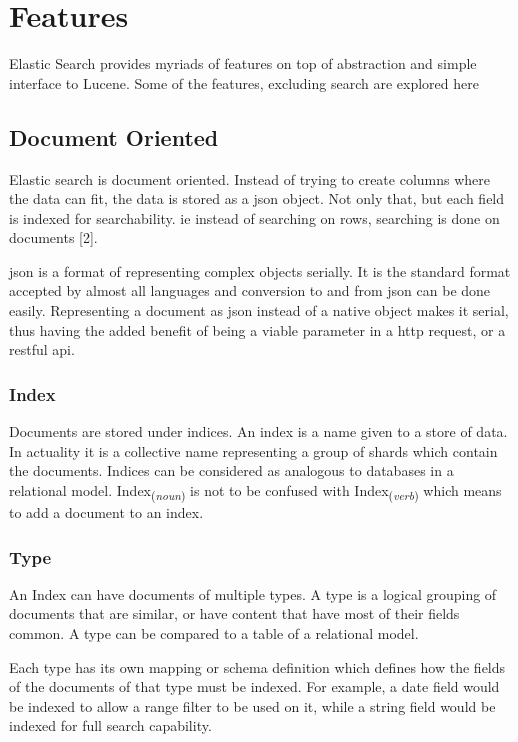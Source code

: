 \documentclass[12pt]{article}
\begin{document}
	\section{Features}
		Elastic Search provides myriads of features on top of abstraction and simple interface to Lucene. Some of the features, excluding search are explored here

		\subsection{Document Oriented}
			Elastic search is document oriented. Instead of trying to create columns where the data can fit, the data is stored as a \ac{json} object. Not only that, but each field is indexed for searchability. ie instead of searching on rows, searching is done on documents \cite{book}[2].

			\ac{json} is a format of representing complex objects serially. It is the standard format accepted by almost all languages and conversion to and from \ac{json} can be done easily. Representing a document as \ac{json} instead of a native object makes it serial, thus having the added benefit of being a viable parameter in a \ac{http} request, or a \ac{rest}ful \ac{api}.

			\subsubsection{Index}
			Documents are stored under indices. An index is a name given to a store of data. In actuality it is a collective name representing a group of shards which contain the documents. Indices can be considered as analogous to databases in a relational model. Index\textsubscript{(\emph{noun})} is not to be confused with Index\textsubscript{(\emph{verb})} which means to add a document to an index.

			\subsubsection{Type}
			An Index can have documents of multiple types. A type is a logical grouping of documents that are similar, or have content that have most of their fields common. A type can be compared to a table of a relational model. 

			Each type has its own mapping or schema definition which defines how the fields of the documents of that type must be indexed. For example, a date field would be indexed to allow a range filter to be used on it, while a string field would be indexed for full search capability.
\end{document}
